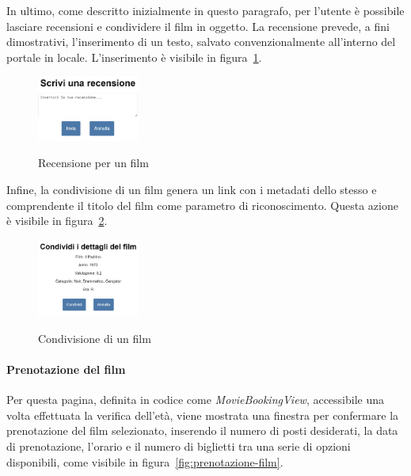 \newpage 

In ultimo, come descritto inizialmente in questo paragrafo, per l'utente è possibile lasciare recensioni e condividere il film in oggetto.
La recensione prevede, a fini dimostrativi, l'inserimento di un testo, salvato convenzionalmente all'interno del portale in locale.
L'inserimento è visibile in figura~\ref{fig:recensione-film}.

\begin{figure}[ht]
    \centering
    \includegraphics[width=0.3\textwidth, alt={Schermata di inserimento di una recensione per un film}]{immagini/frontend/review.png}
    \caption{Recensione per un film}\label{fig:recensione-film}
\end{figure}

Infine, la condivisione di un film genera un link con i metadati dello stesso e comprendente il titolo del film come parametro di riconoscimento.
Questa azione è visibile in figura~\ref{fig:condivisione-film}.

\begin{figure}[ht]
    \centering
    \includegraphics[width=0.3\textwidth, alt={Schermata di condivisione di un film}]{immagini/frontend/share.png}
    \caption{Condivisione di un film}\label{fig:condivisione-film}
\end{figure}

\paragraph{Prenotazione del film}\label{sec:prenotazione-film}
Per questa pagina, definita in codice come \textit{MovieBookingView}, accessibile una volta effettuata la verifica dell'età, viene mostrata una finestra per confermare la prenotazione del film selezionato, 
inserendo il numero di posti desiderati, la data di prenotazione, l'orario e il numero di biglietti tra una serie di opzioni disponibili, come visibile in figura~\ref{fig:prenotazione-film}.

